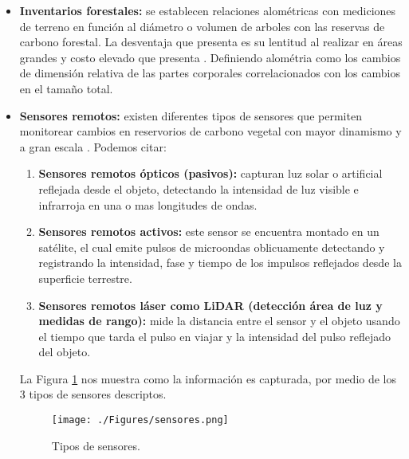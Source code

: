 \begin{itemize}
	
	\item \textbf{Inventarios forestales:} se establecen relaciones alom\'etricas con mediciones de terreno en funci\'on al di\'ametro o volumen de arboles con las reservas de carbono forestal. La desventaja que presenta es su lentitud al realizar en \'areas grandes y costo elevado que presenta \cite{asner2005selective}. Definiendo alom\'etria como los cambios de dimensi\'on relativa de las partes corporales correlacionados con los cambios en el tama\~{n}o total. 
	\item \textbf{Sensores remotos:} existen diferentes tipos de sensores que permiten monitorear cambios en reservorios de carbono vegetal con mayor dinamismo y a gran escala \cite{libro2012Tsuyuki}. Podemos citar:
	\begin{enumerate}
	\item \textbf{Sensores remotos \'opticos (pasivos):} capturan luz solar o artificial reflejada desde el objeto, detectando la intensidad de luz visible e infrarroja en una o mas longitudes de ondas.
	\item  \textbf{Sensores remotos activos:} este sensor se encuentra montado en un sat\'elite, el cual emite pulsos de microondas oblicuamente detectando y registrando la intensidad, fase y tiempo de los impulsos reflejados desde la superficie terrestre.
	\item  \textbf{Sensores remotos l\'aser como LiDAR (detecci\'on \'area de luz y medidas de rango):} mide la distancia entre el sensor y el objeto usando el tiempo que tarda el pulso en viajar y la intensidad del pulso reflejado del objeto.
	\end{enumerate}
	La Figura \ref{fig:sensores} nos muestra como la informaci\'on es capturada, por medio de los 3 tipos de sensores descriptos.  
	    \begin{figure}[!hbtp]
	    	\centering
	    	\texttt{[image: ./Figures/sensores.png]}
	    	\caption{Tipos de sensores.}
	    	\label{fig:sensores}
	    \end{figure}
\end{itemize}


